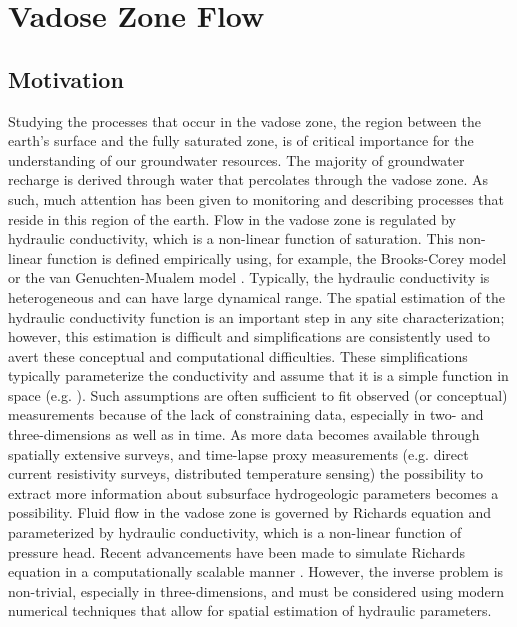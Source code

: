 \documentclass[11pt]{article}
\begin{document}
\section{Vadose Zone Flow}

\subsection{Motivation}

Studying the processes that occur in the vadose zone, the region between the earth's surface and the fully saturated zone, is of critical importance for the understanding of our groundwater resources. The majority of groundwater recharge is derived through water that percolates through the vadose zone. As such, much attention has been given to monitoring and describing processes that reside in this region of the earth. Flow in the vadose zone is regulated by hydraulic conductivity, which is a non-linear function of saturation. This non-linear function is defined empirically using, for example, the Brooks-Corey model \citep{Brooks1964} or the van Genuchten-Mualem model \citep{Mualem1976,VanGenuchten1980}. Typically, the hydraulic conductivity is heterogeneous and can have large dynamical range. The spatial estimation of the hydraulic conductivity function is an important step in any site characterization; however, this estimation is difficult and simplifications are consistently used to avert these conceptual and computational difficulties. These simplifications typically parameterize the conductivity and assume that it is a simple function in space (e.g. \cite{Liang2014}). Such assumptions are often sufficient to fit observed (or conceptual) measurements because of the lack of constraining data, especially in two- and three-dimensions as well as in time. As more data becomes available through spatially extensive surveys, and time-lapse proxy measurements (e.g. direct current resistivity surveys, distributed temperature sensing) the possibility to extract more information about subsurface hydrogeologic parameters becomes a possibility. Fluid flow in the vadose zone is governed by Richards equation and parameterized by hydraulic conductivity, which is a non-linear function of pressure head. Recent advancements have been made to simulate Richards equation in a computationally scalable manner \citep{RichardsFOAM}. However, the inverse problem is non-trivial, especially in three-dimensions, and must be considered using modern numerical techniques that allow for spatial estimation of hydraulic parameters.
\end{document}
